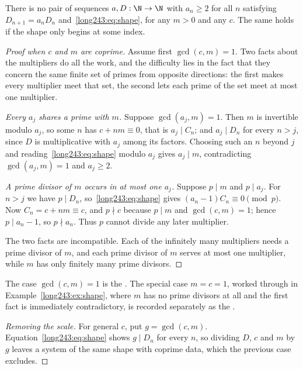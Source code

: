 \begin{theorem}\label{long243:res:constant}
There is no pair of sequences $a,D:\N\to\N$ with $a_n\ge2$ for all $n$
satisfying $D_{n+1}=a_nD_n$ and~\eqref{long243:eq:shape}, for any $m>0$ and any
$c$.  The same holds if the shape only begins at some index.
\end{theorem}

\begin{proof}[Proof when $c$ and $m$ are coprime]
Assume first $\gcd(c,m)=1$.  Two facts about the multipliers do all the work,
and the difficulty lies in the fact that they concern the same finite set of
primes from opposite directions: the first makes every multiplier meet that
set, the second lets each prime of the set meet at most one multiplier.

\emph{Every $a_j$ shares a prime with $m$.}  Suppose $\gcd(a_j,m)=1$.  Then
$m$ is invertible modulo $a_j$, so some $n$ has $c+nm\equiv0$, that is
$a_j\mid C_n$; and $a_j\mid D_n$ for every $n>j$, since $D$ is multiplicative
with $a_j$ among its factors.  Choosing such an $n$ beyond $j$
and reading~\eqref{long243:eq:shape} modulo $a_j$ gives $a_j\mid m$, contradicting
$\gcd(a_j,m)=1$ and $a_j\ge2$.

\emph{A prime divisor of $m$ occurs in at most one $a_j$.}  Suppose $p\mid m$
and $p\mid a_j$.  For $n>j$ we have $p\mid D_n$, so~\eqref{long243:eq:shape} gives
$(a_n-1)C_n\equiv0 \pmod p$.  Now $C_n=c+nm\equiv c$, and $p\nmid c$ because
$p\mid m$ and $\gcd(c,m)=1$; hence $p\mid a_n-1$, so $p\nmid a_n$.  Thus $p$
cannot divide any later multiplier.

The two facts are incompatible.  Each of the infinitely many multipliers needs
a prime divisor of $m$, and each prime divisor of $m$ serves at most one
multiplier, while $m$ has only finitely many prime divisors.
\end{proof}

\noindent The case $\gcd(c,m)=1$ is the
.  The special case $m=c=1$, worked through in
Example~\ref{long243:ex:shape}, where $m$ has no prime divisors at all and the first
fact is immediately contradictory, is recorded separately as the
.

\begin{proof}[Removing the scale]
For general $c$, put $g=\gcd(c,m)$.  Equation~\eqref{long243:eq:shape} shows
$g\mid D_n$ for every $n$, so dividing $D$, $c$ and $m$ by $g$ leaves a system
of the same shape with coprime data, which the previous case excludes.
\end{proof}

